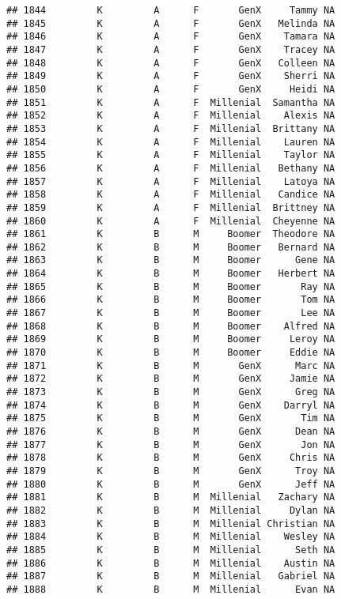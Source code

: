 \documentclass[
]{article}
\begin{document}
\begin{verbatim}
## 1844         K         A      F       GenX     Tammy NA
## 1845         K         A      F       GenX   Melinda NA
## 1846         K         A      F       GenX    Tamara NA
## 1847         K         A      F       GenX    Tracey NA
## 1848         K         A      F       GenX   Colleen NA
## 1849         K         A      F       GenX    Sherri NA
## 1850         K         A      F       GenX     Heidi NA
## 1851         K         A      F  Millenial  Samantha NA
## 1852         K         A      F  Millenial    Alexis NA
## 1853         K         A      F  Millenial  Brittany NA
## 1854         K         A      F  Millenial    Lauren NA
## 1855         K         A      F  Millenial    Taylor NA
## 1856         K         A      F  Millenial   Bethany NA
## 1857         K         A      F  Millenial    Latoya NA
## 1858         K         A      F  Millenial   Candice NA
## 1859         K         A      F  Millenial  Brittney NA
## 1860         K         A      F  Millenial  Cheyenne NA
## 1861         K         B      M     Boomer  Theodore NA
## 1862         K         B      M     Boomer   Bernard NA
## 1863         K         B      M     Boomer      Gene NA
## 1864         K         B      M     Boomer   Herbert NA
## 1865         K         B      M     Boomer       Ray NA
## 1866         K         B      M     Boomer       Tom NA
## 1867         K         B      M     Boomer       Lee NA
## 1868         K         B      M     Boomer    Alfred NA
## 1869         K         B      M     Boomer     Leroy NA
## 1870         K         B      M     Boomer     Eddie NA
## 1871         K         B      M       GenX      Marc NA
## 1872         K         B      M       GenX     Jamie NA
## 1873         K         B      M       GenX      Greg NA
## 1874         K         B      M       GenX    Darryl NA
## 1875         K         B      M       GenX       Tim NA
## 1876         K         B      M       GenX      Dean NA
## 1877         K         B      M       GenX       Jon NA
## 1878         K         B      M       GenX     Chris NA
## 1879         K         B      M       GenX      Troy NA
## 1880         K         B      M       GenX      Jeff NA
## 1881         K         B      M  Millenial   Zachary NA
## 1882         K         B      M  Millenial     Dylan NA
## 1883         K         B      M  Millenial Christian NA
## 1884         K         B      M  Millenial    Wesley NA
## 1885         K         B      M  Millenial      Seth NA
## 1886         K         B      M  Millenial    Austin NA
## 1887         K         B      M  Millenial   Gabriel NA
## 1888         K         B      M  Millenial      Evan NA

\end{verbatim}
\end{document}

